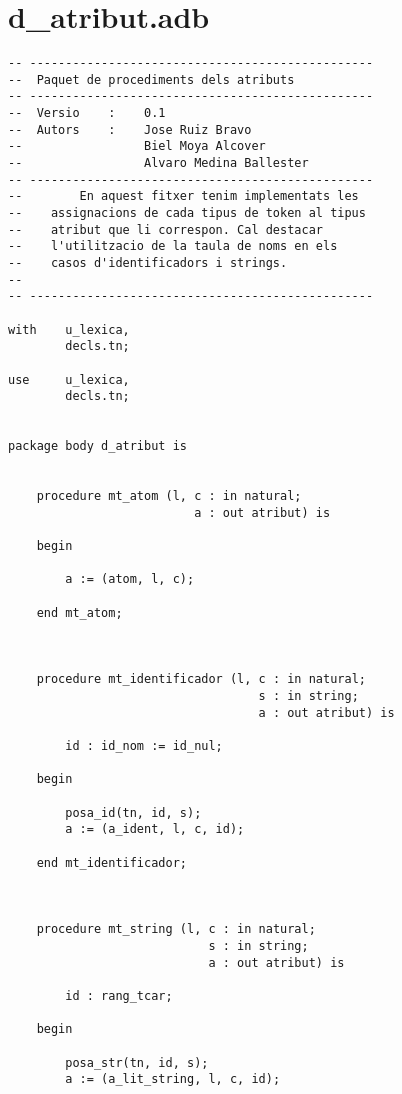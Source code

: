\documentclass[10pt]{report}
\begin{document}
    \newpage
    
    
    \section{d\_atribut.adb}
    \begin{lstlisting}[style=Ada]
-- ------------------------------------------------
--  Paquet de procediments dels atributs
-- ------------------------------------------------
--  Versio    :    0.1
--  Autors    :    Jose Ruiz Bravo
--                 Biel Moya Alcover
--                 Alvaro Medina Ballester
-- ------------------------------------------------
--        En aquest fitxer tenim implementats les 
--    assignacions de cada tipus de token al tipus
--    atribut que li correspon. Cal destacar 
--    l'utilitzacio de la taula de noms en els
--    casos d'identificadors i strings.
--
-- ------------------------------------------------

with    u_lexica,
        decls.tn;

use     u_lexica,
        decls.tn;
        

package body d_atribut is    
    
    
    procedure mt_atom (l, c : in natural; 
                          a : out atribut) is
    
    begin
    
        a := (atom, l, c);
        
    end mt_atom;
    
    
    
    procedure mt_identificador (l, c : in natural; 
                                   s : in string; 
                                   a : out atribut) is
    
        id : id_nom := id_nul;
        
    begin
    
        posa_id(tn, id, s);
        a := (a_ident, l, c, id);
        
    end mt_identificador;
    
    
    
    procedure mt_string (l, c : in natural; 
                            s : in string; 
                            a : out atribut) is
    
        id : rang_tcar;
        
    begin
    
        posa_str(tn, id, s);
        a := (a_lit_string, l, c, id);
        

\end{lstlisting}
\end{document}
